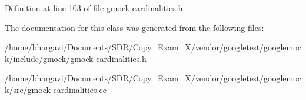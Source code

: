 Definition at line 103 of file gmock-\/cardinalities.\+h.



The documentation for this class was generated from the following files\+:\begin{DoxyCompactItemize}
\item 
/home/bhargavi/\+Documents/\+S\+D\+R/\+Copy\+\_\+\+Exam\+\_\+X/vendor/googletest/googlemock/include/gmock/\hyperlink{gmock-cardinalities_8h}{gmock-\/cardinalities.\+h}\item 
/home/bhargavi/\+Documents/\+S\+D\+R/\+Copy\+\_\+\+Exam\+\_\+X/vendor/googletest/googlemock/src/\hyperlink{gmock-cardinalities_8cc}{gmock-\/cardinalities.\+cc}\end{DoxyCompactItemize}
